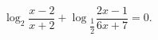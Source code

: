 \begin{ex}[type=equation]
	\begin{condition}
		$\log_2 \dfrac{x - 2}{x + 2} + \log$\tiny$_{\dfrac{1}{2}}$\normalsize$\dfrac{2x - 1}{6x + 7} = 0.$
	\end{condition}
\end{ex}